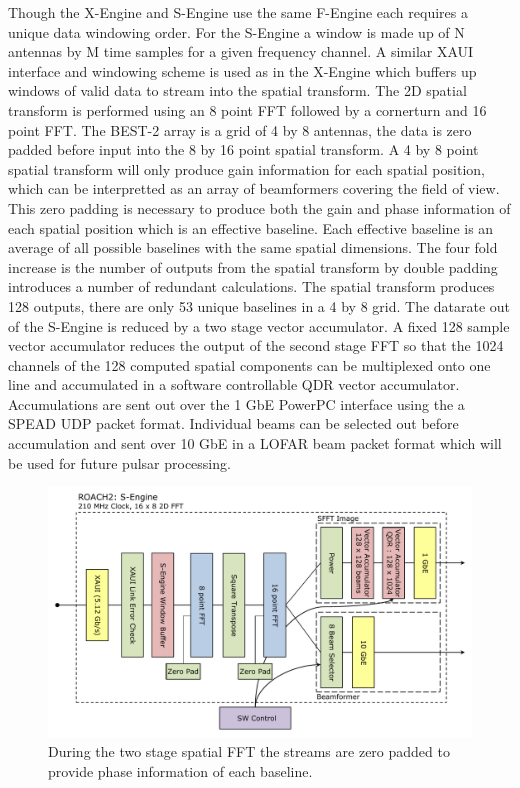 \documentclass[useAMS,macros,usenatbib,onecolumn]{mn2e}
\begin{document}
Though the X-Engine and S-Engine use the same F-Engine each requires a unique data windowing order.
For the S-Engine a window is made up of N antennas by M time samples for a given frequency channel.
A similar XAUI interface and windowing scheme is used as in the X-Engine which buffers up windows of valid data to stream into the spatial transform.
The 2D spatial transform is performed using an 8 point FFT followed by a cornerturn and 16 point FFT.
The BEST-2 array is a grid of 4 by 8 antennas, the data is zero padded before input into the 8 by 16 point spatial transform.
A 4 by 8 point spatial transform will only produce gain information for each spatial position, which can be interpretted as an array of beamformers covering the field of view.
This zero padding is necessary to produce both the gain and phase information of each spatial position which is an effective baseline.
Each effective baseline is an average of all possible baselines with the same spatial dimensions.
The four fold increase is the number of outputs from the spatial transform by double padding introduces a number of redundant calculations.
The spatial transform produces 128 outputs, there are only 53 unique baselines in a 4 by 8 grid.
The datarate out of the S-Engine is reduced by a two stage vector accumulator.
A fixed 128 sample vector accumulator reduces the output of the second stage FFT so that the 1024 channels of the 128 computed spatial components can be multiplexed onto one line and accumulated in a software controllable QDR vector accumulator.
Accumulations are sent out over the 1 GbE PowerPC interface using the a SPEAD UDP packet format.
Individual beams can be selected out before accumulation and sent over 10 GbE in a LOFAR beam packet format which will be used for future pulsar processing.

\begin{figure}
    \centering
    \includegraphics[scale=0.6]{graphics/crop_sengine_block.pdf}
    \caption{During the two stage spatial FFT the streams are zero padded to provide phase information of each baseline.}
    \label{fig:seng_block}
\end{figure}
\end{document}
